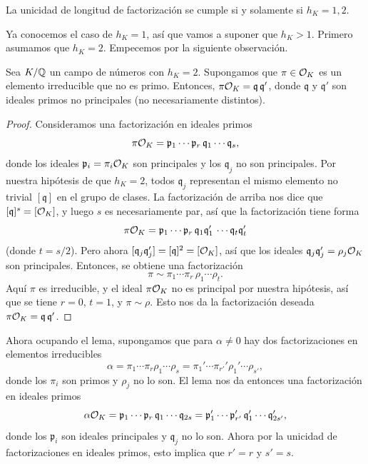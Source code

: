 \begin{teorema}
  La unicidad de longitud de factorización se cumple si y solamente si
  $h_K = 1,2$.
\end{teorema}

Ya conocemos el caso de $h_K = 1$, así que vamos a suponer que
$h_K > 1$. Primero asumamos que $h_K = 2$. Empecemos por la siguiente
observación.

\begin{lema}
  Sea $K/\mathbb{Q}$ un campo de números con $h_K = 2$. Supongamos que $\pi \in \mathcal{O}_K$
  es un elemento irreducible que no es primo. Entonces,
  $\pi\mathcal{O}_K = \mathfrak{q}\,\mathfrak{q}'$, donde
  $\mathfrak{q}$ y $\mathfrak{q}'$ son ideales primos no principales
  (no necesariamente distintos).

  \begin{proof}
    Consideramos una factorización en ideales primos
    $$\pi\mathcal{O}_K = \mathfrak{p}_1 \cdots \mathfrak{p}_r\,\mathfrak{q}_1 \cdots \mathfrak{q}_s,$$
    donde los ideales $\mathfrak{p}_i = \pi_i \mathcal{O}_K$ son principales y los
    $\mathfrak{q}_j$ no son principales. Por nuestra hipótesis de que $h_K = 2$,
    todos $\mathfrak{q}_j$ representan el mismo elemento no trivial
    $[\mathfrak{q}]$ en el grupo de clases. La factorización de arriba nos dice
    que $[\mathfrak{q}]^s = [\mathcal{O}_K]$, y luego $s$ es necesariamente par, así
    que la factorización tiene forma
    $$\pi\mathcal{O}_K = \mathfrak{p}_1 \cdots \mathfrak{p}_r\,\mathfrak{q}_1 \mathfrak{q}_1'\, \cdots \mathfrak{q}_t \mathfrak{q}_t'$$
    (donde $t = s/2$). Pero ahora
    $[\mathfrak{q}_j \mathfrak{q}_j'] = [\mathfrak{q}]^2 = [\mathcal{O}_K]$,
    así que los ideales $\mathfrak{q}_j \mathfrak{q}_j' = \rho_j \mathcal{O}_K$ son
    principales. Entonces, se obtiene una factorización
    $$\pi \sim \pi_1 \cdots \pi_r\,\rho_1 \cdots \rho_t.$$
    Aquí $\pi$ es irreducible, y el ideal $\pi \mathcal{O}_K$ no es principal por nuestra
    hipótesis, así que se tiene $r = 0$, $t = 1$, y $\pi \sim \rho$. Esto nos da
    la factorización deseada $\pi \mathcal{O}_K = \mathfrak{q}\,\mathfrak{q}'$.
  \end{proof}
\end{lema}

Ahora ocupando el lema, supongamos que para $\alpha \ne 0$ hay dos
factorizaciones en elementos irreducibles
$$\alpha = \pi_1 \cdots \pi_r \rho_1 \cdots \rho_s = \pi_1' \cdots \pi_{r'}' \rho_1' \cdots \rho_{s'},$$
donde los $\pi_i$ son primos y $\rho_j$ no lo son. El lema nos da entonces una
factorización en ideales primos
$$\alpha \mathcal{O}_K = \mathfrak{p}_1 \cdots \mathfrak{p}_r\,\mathfrak{q}_1 \cdots \mathfrak{q}_{2s} = \mathfrak{p}_1' \cdots \mathfrak{p}_{r'}'\,\mathfrak{q}_1' \cdots \mathfrak{q}_{2s'}',$$
donde los $\mathfrak{p}_i$ son ideales principales y $\mathfrak{q}_j$ no lo son.
Ahora por la unicidad de factorizaciones en ideales primos, esto implica que
$r' = r$ y $s' = s$.


